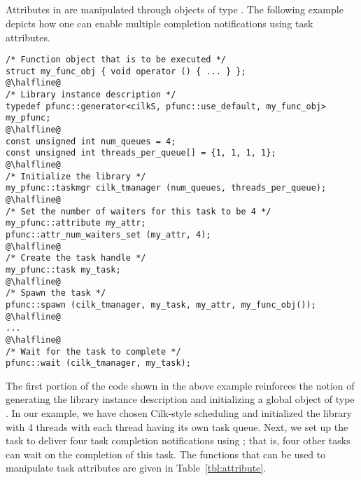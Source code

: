 \subsection{\Cpp{}}
Attributes in \Cpp{} are manipulated through objects of type .
The following example depicts how one can enable multiple completion
notifications using task attributes.
%
\begin{lstlisting}
/* Function object that is to be executed */
struct my_func_obj { void operator () { ... } };
@\halfline@
/* Library instance description */
typedef pfunc::generator<cilkS, pfunc::use_default, my_func_obj> my_pfunc;
@\halfline@
const unsigned int num_queues = 4; 
const unsigned int threads_per_queue[] = {1, 1, 1, 1}; 
@\halfline@
/* Initialize the library */
my_pfunc::taskmgr cilk_tmanager (num_queues, threads_per_queue);
@\halfline@
/* Set the number of waiters for this task to be 4 */
my_pfunc::attribute my_attr;
pfunc::attr_num_waiters_set (my_attr, 4);
@\halfline@
/* Create the task handle */
my_pfunc::task my_task;
@\halfline@
/* Spawn the task */
pfunc::spawn (cilk_tmanager, my_task, my_attr, my_func_obj());
@\halfline@
...
@\halfline@
/* Wait for the task to complete */
pfunc::wait (cilk_tmanager, my_task);
\end{lstlisting}
%
The first portion of the code shown in the above example reinforces the notion
of generating the library instance description and initializing a global object
of type . 
%
In our example, we have chosen Cilk-style scheduling and initialized the
library with 4 threads with each thread having its own task queue. 
%
Next, we set up the task to deliver four task completion notifications using
; that is, four other tasks can wait on the
completion of this task. 
%
The functions that can be used to manipulate task attributes are given in 
Table~\ref{tbl:attribute}.
%

